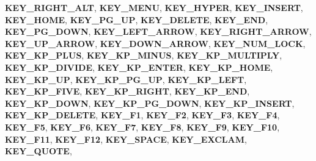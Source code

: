 \begin{DoxyCompactItemize}
{\bfseries K\+E\+Y\+\_\+\+R\+I\+G\+H\+T\+\_\+\+A\+LT}, 
\newline
{\bfseries K\+E\+Y\+\_\+\+M\+E\+NU}, 
{\bfseries K\+E\+Y\+\_\+\+H\+Y\+P\+ER}, 
{\bfseries K\+E\+Y\+\_\+\+I\+N\+S\+E\+RT}, 
{\bfseries K\+E\+Y\+\_\+\+H\+O\+ME}, 
\newline
{\bfseries K\+E\+Y\+\_\+\+P\+G\+\_\+\+UP}, 
{\bfseries K\+E\+Y\+\_\+\+D\+E\+L\+E\+TE}, 
{\bfseries K\+E\+Y\+\_\+\+E\+ND}, 
{\bfseries K\+E\+Y\+\_\+\+P\+G\+\_\+\+D\+O\+WN}, 
\newline
{\bfseries K\+E\+Y\+\_\+\+L\+E\+F\+T\+\_\+\+A\+R\+R\+OW}, 
{\bfseries K\+E\+Y\+\_\+\+R\+I\+G\+H\+T\+\_\+\+A\+R\+R\+OW}, 
{\bfseries K\+E\+Y\+\_\+\+U\+P\+\_\+\+A\+R\+R\+OW}, 
{\bfseries K\+E\+Y\+\_\+\+D\+O\+W\+N\+\_\+\+A\+R\+R\+OW}, 
\newline
{\bfseries K\+E\+Y\+\_\+\+N\+U\+M\+\_\+\+L\+O\+CK}, 
{\bfseries K\+E\+Y\+\_\+\+K\+P\+\_\+\+P\+L\+US}, 
{\bfseries K\+E\+Y\+\_\+\+K\+P\+\_\+\+M\+I\+N\+US}, 
{\bfseries K\+E\+Y\+\_\+\+K\+P\+\_\+\+M\+U\+L\+T\+I\+P\+LY}, 
\newline
{\bfseries K\+E\+Y\+\_\+\+K\+P\+\_\+\+D\+I\+V\+I\+DE}, 
{\bfseries K\+E\+Y\+\_\+\+K\+P\+\_\+\+E\+N\+T\+ER}, 
{\bfseries K\+E\+Y\+\_\+\+K\+P\+\_\+\+H\+O\+ME}, 
{\bfseries K\+E\+Y\+\_\+\+K\+P\+\_\+\+UP}, 
\newline
{\bfseries K\+E\+Y\+\_\+\+K\+P\+\_\+\+P\+G\+\_\+\+UP}, 
{\bfseries K\+E\+Y\+\_\+\+K\+P\+\_\+\+L\+E\+FT}, 
{\bfseries K\+E\+Y\+\_\+\+K\+P\+\_\+\+F\+I\+VE}, 
{\bfseries K\+E\+Y\+\_\+\+K\+P\+\_\+\+R\+I\+G\+HT}, 
\newline
{\bfseries K\+E\+Y\+\_\+\+K\+P\+\_\+\+E\+ND}, 
{\bfseries K\+E\+Y\+\_\+\+K\+P\+\_\+\+D\+O\+WN}, 
{\bfseries K\+E\+Y\+\_\+\+K\+P\+\_\+\+P\+G\+\_\+\+D\+O\+WN}, 
{\bfseries K\+E\+Y\+\_\+\+K\+P\+\_\+\+I\+N\+S\+E\+RT}, 
\newline
{\bfseries K\+E\+Y\+\_\+\+K\+P\+\_\+\+D\+E\+L\+E\+TE}, 
{\bfseries K\+E\+Y\+\_\+\+F1}, 
{\bfseries K\+E\+Y\+\_\+\+F2}, 
{\bfseries K\+E\+Y\+\_\+\+F3}, 
\newline
{\bfseries K\+E\+Y\+\_\+\+F4}, 
{\bfseries K\+E\+Y\+\_\+\+F5}, 
{\bfseries K\+E\+Y\+\_\+\+F6}, 
{\bfseries K\+E\+Y\+\_\+\+F7}, 
\newline
{\bfseries K\+E\+Y\+\_\+\+F8}, 
{\bfseries K\+E\+Y\+\_\+\+F9}, 
{\bfseries K\+E\+Y\+\_\+\+F10}, 
{\bfseries K\+E\+Y\+\_\+\+F11}, 
\newline
{\bfseries K\+E\+Y\+\_\+\+F12}, 
{\bfseries K\+E\+Y\+\_\+\+S\+P\+A\+CE}, 
{\bfseries K\+E\+Y\+\_\+\+E\+X\+C\+L\+AM}, 
{\bfseries K\+E\+Y\+\_\+\+Q\+U\+O\+TE}, 
\newline

\end{DoxyCompactItemize}
